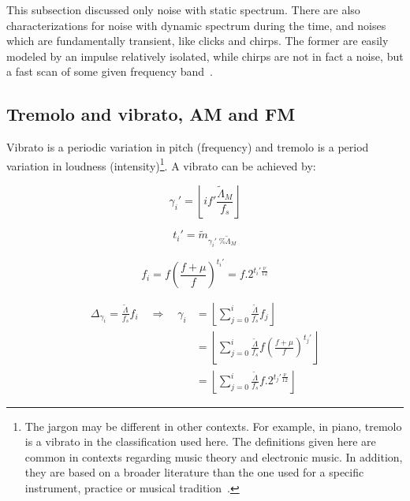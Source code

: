 This subsection discussed only noise with static spectrum. There are also characterizations for noise with dynamic spectrum during the time, and noises which are fundamentally transient, like clicks and chirps. The former are easily modeled by an impulse relatively isolated, while chirps are not in fact a noise, but a fast scan of some given frequency band~\cite{Cook}.

\subsection{Tremolo and vibrato, AM and FM}\label{subsec:tvaf}
Vibrato is a periodic variation in pitch (frequency) and tremolo is a period variation in loudness (intensity)\footnote{The jargon may be different in other contexts. For example, in piano, tremolo is a vibrato in the classification used here. The definitions given here are common in contexts regarding music theory and electronic music. In addition, they are based on a broader literature than the one used for a specific instrument, practice or musical tradition~\cite{Lacerda,Harmonia}.}.
A vibrato can be achieved by:

\begin{equation}\label{vbrGamma}
 \gamma_i'=\left \lfloor i f' \frac{\widetilde{\Lambda}_M}{f_s} \right \rfloor
\end{equation}

\begin{equation}\label{vbrAux}
 t_i'=\widetilde{m}_{\gamma_i' \;\% \widetilde{\Lambda}_M}
\end{equation}

\begin{equation}\label{vbrF}
 f_i=f \left ( \frac{f + \mu }{f} \right )^{t_i'}=f . 2^{t_i'\frac{\nu}{12}}
\end{equation}

\begin{equation}\label{vbrGamma2}
\begin{split}
	\Delta_{\gamma_i}=\frac{\widetilde{\Lambda}}{f_s}f_i \quad \Rightarrow \quad \gamma_i & = \left \lfloor \sum_{j=0}^{i} \frac{\widetilde{\Lambda}}{f_s}f_j \right \rfloor \\ 
	& = \left \lfloor \sum_{j=0}^{i} \frac{\widetilde{\Lambda}}{f_s}f \left ( \frac{f + \mu }{f} \right )^{t_j'}  \right \rfloor \\
	& = \left \lfloor \sum_{j=0}^{i} \frac{\widetilde{\Lambda}}{f_s}f . 2^{t_j'\frac{\nu}{12}}  \right \rfloor
\end{split}
\end{equation}

